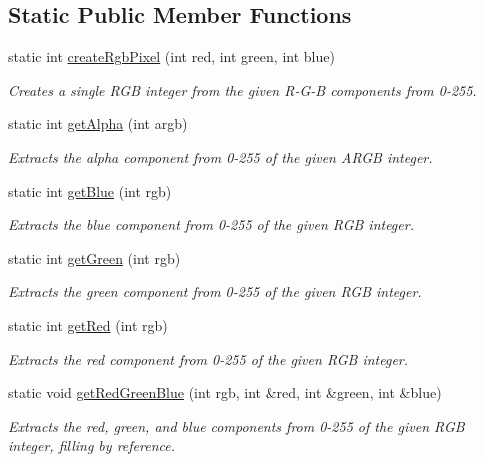 \subsection*{Static Public Member Functions}
\begin{DoxyCompactItemize}
\item 
static int \mbox{\hyperlink{classGCanvas_a10beefcf8631433d0cdddefd4e24c76a}{create\+Rgb\+Pixel}} (int red, int green, int blue)
\begin{DoxyCompactList}\small\item\em Creates a single R\+GB integer from the given R-\/\+G-\/B components from 0-\/255. \end{DoxyCompactList}\item 
static int \mbox{\hyperlink{classGCanvas_a48d898ddf58651669b5f33240a65096f}{get\+Alpha}} (int argb)
\begin{DoxyCompactList}\small\item\em Extracts the alpha component from 0-\/255 of the given A\+R\+GB integer. \end{DoxyCompactList}\item 
static int \mbox{\hyperlink{classGCanvas_a9406c01e6961257db37b5dc95945f914}{get\+Blue}} (int rgb)
\begin{DoxyCompactList}\small\item\em Extracts the blue component from 0-\/255 of the given R\+GB integer. \end{DoxyCompactList}\item 
static int \mbox{\hyperlink{classGCanvas_ac307c120ba81c4531d46924ba3358382}{get\+Green}} (int rgb)
\begin{DoxyCompactList}\small\item\em Extracts the green component from 0-\/255 of the given R\+GB integer. \end{DoxyCompactList}\item 
static int \mbox{\hyperlink{classGCanvas_adef2eb72dada1f3c3ef5079705cd278a}{get\+Red}} (int rgb)
\begin{DoxyCompactList}\small\item\em Extracts the red component from 0-\/255 of the given R\+GB integer. \end{DoxyCompactList}\item 
static void \mbox{\hyperlink{classGCanvas_ab13dd3d16d2b7bd90fbf9595df9cf2b7}{get\+Red\+Green\+Blue}} (int rgb, int \&red, int \&green, int \&blue)
\begin{DoxyCompactList}\small\item\em Extracts the red, green, and blue components from 0-\/255 of the given R\+GB integer, filling by reference. \end{DoxyCompactList}\end{DoxyCompactItemize}
